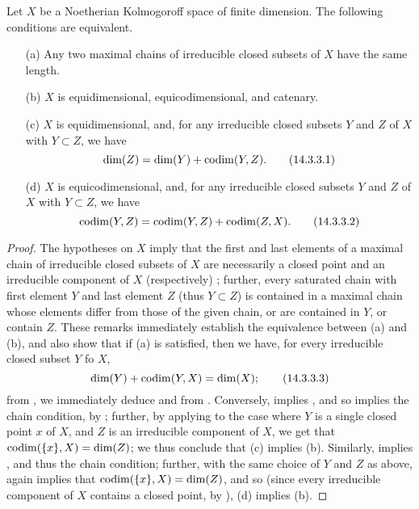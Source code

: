 \begin{proposition}[14.3.3]
\label{0.14.3.3}
Let $X$ be a Noetherian Kolmogoroff space of finite dimension.
The following conditions are equivalent.
\begin{enumerate}
  \item[{\rm(a)}] Any two maximal chains of irreducible closed subsets of $X$ have the same length.
  \item[{\rm(b)}] $X$ is equidimensional, equicodimensional, and catenary.
  \item[{\rm(c)}] $X$ is equidimensional, and, for any irreducible closed subsets $Y$ and $Z$ of $X$ with $Y\subset Z$, we have
    \[
    \label{eq:0.14.3.3.1}
      \dim(Z)=\dim(Y)+\operatorname{codim}(Y,Z).
      \tag{14.3.3.1}
    \]
  \item[{\rm(d)}] $X$ is equicodimensional, and, for any irreducible closed subsets $Y$ and $Z$ of $X$ with $Y\subset Z$, we have
    \[
    \label{eq:0.14.3.3.2}
      \operatorname{codim}(Y,Z)=\operatorname{codim}(Y,Z)+\operatorname{codim}(Z,X).
      \tag{14.3.3.2}
    \]
\end{enumerate}
\end{proposition}

\begin{proof}
\label{proof-0.14.3.3}
The hypotheses on $X$ imply that the first and last elements of a maximal chain of irreducible closed subsets of $X$ are necessarily a closed point and an irreducible component of $X$ (respectively) ;
further, every saturated chain with first element $Y$ and last element $Z$ (thus $Y\subset Z$) is contained in a maximal chain whose elements differ from those of the given chain, or are contained in $Y$, or contain $Z$.
These remarks immediately establish the equivalence between (a) and (b), and also show that if (a) is satisfied, then we have, for every irreducible closed subset $Y$ fo $X$,
\[
\label{eq:0.14.3.3.3}
  \dim(Y)+\operatorname{codim}(Y,X)=\dim(X);
  \tag{14.3.3.3}
\]
from , we immediately deduce  and  from .
Conversely,  implies , and so  implies the chain condition, by ;
further, by applying  to the case where $Y$ is a single closed point $x$ of $X$, and $Z$ is an irreducible component of $X$, we get that $\operatorname{codim}(\{x\},X)=\dim(Z)$;
we thus conclude that (c) implies (b).
Similarly,  implies , and thus the chain condition;
further, with the same choice of $Y$ and $Z$ as above,  again implies that $\operatorname{codim}(\{x\},X)=\dim(Z)$, and so (since every irreducible component of $X$ contains a closed point, by ), (d) implies (b).
\end{proof}

